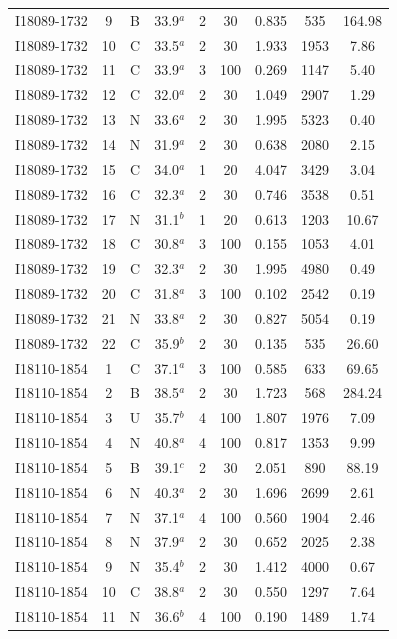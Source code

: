 \begin{table}
\begin{tabular}{ccccccccc}
I18089-1732 & 9 & B & 33.9$^{a}$ & 2 & 30 & 0.835 & 535 & 164.98 \\
I18089-1732 & 10 & C & 33.5$^{a}$ & 2 & 30 & 1.933 & 1953 & 7.86 \\
I18089-1732 & 11 & C & 33.9$^{a}$ & 3 & 100 & 0.269 & 1147 & 5.40 \\
I18089-1732 & 12 & C & 32.0$^{a}$ & 2 & 30 & 1.049 & 2907 & 1.29 \\
I18089-1732 & 13 & N & 33.6$^{a}$ & 2 & 30 & 1.995 & 5323 & 0.40 \\
I18089-1732 & 14 & N & 31.9$^{a}$ & 2 & 30 & 0.638 & 2080 & 2.15 \\
I18089-1732 & 15 & C & 34.0$^{a}$ & 1 & 20 & 4.047 & 3429 & 3.04 \\
I18089-1732 & 16 & C & 32.3$^{a}$ & 2 & 30 & 0.746 & 3538 & 0.51 \\
I18089-1732 & 17 & N & 31.1$^{b}$ & 1 & 20 & 0.613 & 1203 & 10.67 \\
I18089-1732 & 18 & C & 30.8$^{a}$ & 3 & 100 & 0.155 & 1053 & 4.01 \\
I18089-1732 & 19 & C & 32.3$^{a}$ & 2 & 30 & 1.995 & 4980 & 0.49 \\
I18089-1732 & 20 & C & 31.8$^{a}$ & 3 & 100 & 0.102 & 2542 & 0.19 \\
I18089-1732 & 21 & N & 33.8$^{a}$ & 2 & 30 & 0.827 & 5054 & 0.19 \\
I18089-1732 & 22 & C & 35.9$^{b}$ & 2 & 30 & 0.135 & 535 & 26.60 \\
I18110-1854 & 1 & C & 37.1$^{a}$ & 3 & 100 & 0.585 & 633 & 69.65 \\
I18110-1854 & 2 & B & 38.5$^{a}$ & 2 & 30 & 1.723 & 568 & 284.24 \\
I18110-1854 & 3 & U & 35.7$^{b}$ & 4 & 100 & 1.807 & 1976 & 7.09 \\
I18110-1854 & 4 & N & 40.8$^{a}$ & 4 & 100 & 0.817 & 1353 & 9.99 \\
I18110-1854 & 5 & B & 39.1$^{c}$ & 2 & 30 & 2.051 & 890 & 88.19 \\
I18110-1854 & 6 & N & 40.3$^{a}$ & 2 & 30 & 1.696 & 2699 & 2.61 \\
I18110-1854 & 7 & N & 37.1$^{a}$ & 4 & 100 & 0.560 & 1904 & 2.46 \\
I18110-1854 & 8 & N & 37.9$^{a}$ & 2 & 30 & 0.652 & 2025 & 2.38 \\
I18110-1854 & 9 & N & 35.4$^{b}$ & 2 & 30 & 1.412 & 4000 & 0.67 \\
I18110-1854 & 10 & C & 38.8$^{a}$ & 2 & 30 & 0.550 & 1297 & 7.64 \\
I18110-1854 & 11 & N & 36.6$^{b}$ & 4 & 100 & 0.190 & 1489 & 1.74 \\

\end{tabular}
\end{table}
